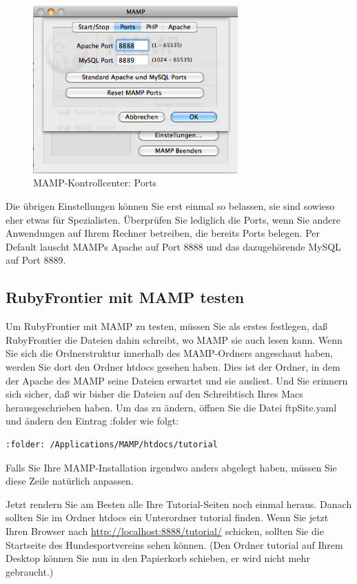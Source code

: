 \documentclass[11pt]{report}
\begin{document}
\begin{figure}[h!]
\centering
\includegraphics[width=0.7\textwidth]{./images/mamp03.png}
\caption{\label{mamp03}MAMP-Kontrollcenter: Ports}
\end{figure}

Die übrigen Einstellungen können Sie erst einmal so belassen, sie sind
sowieso eher etwas für Spezialisten. Überprüfen Sie lediglich die
Ports, wenn Sie andere Anwendungen auf Ihrem Rechner betreiben, die
bereits Ports belegen. Per Default lauscht MAMPs Apache auf Port 8888
und das dazugehörende MySQL auf Port 8889.
\subsection{RubyFrontier mit MAMP testen}
\label{sec-2-2-2-1}


Um RubyFrontier mit MAMP zu testen, müssen Sie als erstes festlegen,
daß RubyFrontier die Dateien dahin schreibt, wo MAMP sie auch lesen
kann. Wenn Sie sich die Ordnerstruktur innerhalb des MAMP-Ordners
angeschaut haben, werden Sie dort den Ordner htdocs gesehen
haben. Dies ist der Ordner, in dem der Apache des MAMP seine Dateien
erwartet und sie ausliest. Und Sie erinnern sich sicher, daß wir
bisher die Dateien auf den Schreibtisch Ihres Macs herausgeschrieben
haben. Um das zu ändern, öffnen Sie die Datei ftpSite.yaml und ändern
den Eintrag :folder wie folgt:


\begin{verbatim}
:folder: /Applications/MAMP/htdocs/tutorial
\end{verbatim}

Falls Sie Ihre MAMP-Installation irgendwo anders abgelegt haben,
müssen Sie diese Zeile natürlich anpassen.


Jetzt rendern Sie am Besten alle Ihre Tutorial-Seiten noch einmal
heraus. Danach sollten Sie im Ordner htdocs ein Unterordner tutorial
finden. Wenn Sie jetzt Ihren Browser nach
\href{http://localhost:8888/tutorial/}{http://localhost:8888/tutorial/} schicken, sollten Sie die Startseite
des Hundesportvereins sehen können. (Den Ordner tutorial auf Ihrem
Desktop können Sie nun in den Papierkorb schieben, er wird nicht mehr
gebraucht.)
\end{document}
